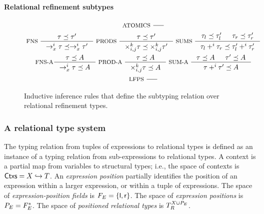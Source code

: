 \paragraph{Relational refinement subtypes}
%
\begin{figure}
  \centering
  \begin{gather*}
    \inference[ ATOMICS ]{ }{ } \\
    \inference[ FNS ]{
      \tau \subtype \tau' }{
      \to_x^i \tau \subtype \to_x^i \tau' } 
    \inference[ PRODS ]{ \tau \subtype \tau'}{
      \times_{i, j}^k \tau \subtype \times_{i, j}^k \tau'}
    \inference[ SUMS ]{
      \tau_l \subtype \tau_l' & \tau_r \subtype \tau_r' }{
      \tau_l +^i \tau_r \subtype \tau_l' +^i \tau_r' } \\
    \inference[ FNS-A]{ \tau \subtype A }{
      \rightarrow_x^i \tau \subtype A } 
    \inference[ PROD-A ]{ \tau \subtype A }{
      \times^k_{i, j} \tau \subtype A }
    \inference[ SUM-A ]{ \tau \subtype A & \tau' \subtype A }{
      \tau +^i \tau' \subtype A } \\
    \inference[ LFPS ]{}{} 
  \end{gather*}
  \caption{Inductive inference rules that define the subtyping relation over relational refinement types.
     }
  \label{fig:subtypes}
\end{figure}


\subsubsection{A relational type system}
\label{sec:rel-type-sys}
%
The typing relation from tuples of expressions to relational types is
defined as an instance of a typing relation from sub-expressions to
relational types.
A context is a partial map from variables to structural types;
%
i.e., the space of contexts is $\mathsf{Ctxs} = X \hookrightarrow T$.
An \emph{expression position} partially identifies the position of an
expression within a larger expression, or within a tuple of
expressions.
%
The space of \emph{expression-position fields} is
$F_E = \{  \mathsf{l}, \mathsf{r}  \}$.
%
The space of \emph{expression positions} is
$P_E = F_E^{*}$.
% 
The space of \emph{positioned relational types} is
$T_{R}^{X \cup P_E}$.


